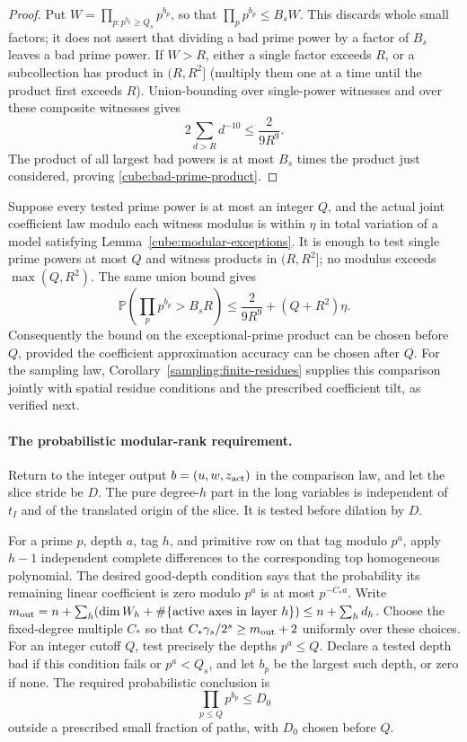 \begin{proof}
Put $W=\prod_{p:p^{b_p}\ge Q_s}p^{b_p}$, so that
$\prod_p p^{b_p}\le B_sW$.  This discards whole small factors;
it does not assert that dividing a bad prime power by a factor of
$B_s$ leaves a bad prime power.  If $W>R$, either a single factor
exceeds $R$, or a subcollection has product in $(R,R^2]$ (multiply them
one at a time until the product first exceeds $R$).  Union-bounding over
single-power witnesses and over these composite witnesses gives
\[
 2\sum_{d>R}d^{-10}\leq\frac{2}{9R^9}.
\]
The product of all largest bad powers is at most $B_s$ times the product
just considered, proving \eqref{cube:bad-prime-product}.
\end{proof}

\begin{remark}
Suppose every tested prime power is at most an integer $Q$, and the actual
joint coefficient law modulo each witness modulus is within $\eta$ in
total variation of a model satisfying Lemma~\ref{cube:modular-exceptions}.
It is enough to test single prime powers at most $Q$ and witness products
in $(R,R^2]$; no modulus exceeds $\max(Q,R^2)$.  The same union bound gives
\[
 \mathbb P\left(\prod_p p^{b_p}>B_sR\right)
 \leq\frac{2}{9R^9}+(Q+R^2)\eta.
\]
Consequently the bound on the exceptional-prime product can be chosen
before $Q$, provided the coefficient approximation accuracy can be
chosen after $Q$. For the sampling law,
Corollary~\ref{sampling:finite-residues} supplies this comparison
jointly with spatial residue conditions and the prescribed coefficient
tilt, as verified next.
\end{remark}


\paragraph{The probabilistic modular-rank requirement.}
Return to the integer output $b=(u,w,z_{\rm act})$ in the
comparison law, and let the slice stride be $D$.
The pure degree-$h$ part in the long variables is independent of
$t_I$ and of the translated origin of the slice.  It is tested
before dilation by $D$.

For a prime $p$, depth $a$, tag $h$, and primitive row on that tag
modulo $p^a$, apply $h-1$ independent complete differences to the
corresponding top homogeneous polynomial.  The desired good-depth
condition says that the probability its remaining linear
coefficient is zero modulo $p^a$ is at most $p^{-C_*a}$.
Write $m_{\rm out}=n+\sum_h(\dim W_h+\#\{\text{active axes in layer }h\})
\le n+\sum_h d_h$.  Choose the fixed-degree multiple $C_*$ so that
$C_*\gamma_s/2^s\ge m_{\rm out}+2$ uniformly over these choices.
For an integer cutoff $Q$, test precisely the depths $p^a\le Q$.
Declare a tested depth bad if this condition fails or $p^a<Q_s$,
and let $b_p$ be the largest such depth, or zero if none.
The required
probabilistic conclusion is
\begin{equation}
                  \prod_{p\le Q}p^{b_p}\le D_0
 \label{cube:bad-product}
\end{equation}
outside a prescribed small fraction of paths, with $D_0$ chosen
before $Q$.

